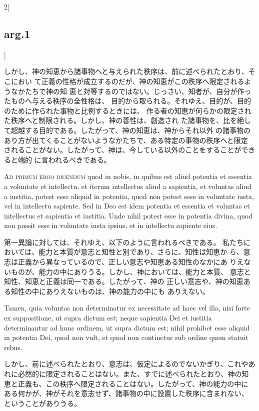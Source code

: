\documentclass[paper=a4paper,fontsize=10pt,jafontsize=9pt,titlepage]{jlreq}
\begin{document}
\begin{paracol}{2}[\subsection{arg.1}]
\switchcolumn

しかし、神の知恵から諸事物へと与えられた秩序は、前に述べられたとおり、そこにおい
て正義の性格が成立するのだが、神の知恵がこの秩序へ限定されるようなかたちで神の知
恵と対等するのではない。じっさい、知者が、自分が作ったものへ与える秩序の全性格は、
目的から取られる。それゆえ、目的が、目的のために作られた事物と比例するときには、
作る者の知恵が何らかの限定された秩序へと制限される。しかし、神の善性は、創造され
た諸事物を、比を絶して超越する目的である。したがって、神の知恵は、神からそれ以外
の諸事物のあり方が出てくることがないようなかたちで、ある特定の事物の秩序へと限定
されることがない。したがって、神は、今している以外のことをすることができると端的
に言われるべきである。

\switchcolumn*[\subsection{ad.1}]

{\scshape Ad primum ergo dicendum} quod in nobis, in quibus est aliud potentia
et essentia a voluntate et intellectu, et iterum intellectus aliud a sapientia,
et voluntas aliud a iustitia, potest esse aliquid in potentia, quod non potest
esse in voluntate iusta, vel in intellectu sapiente. Sed in Deo est idem
potentia et essentia et voluntas et intellectus et sapientia et iustitia. Unde
nihil potest esse in potentia divina, quod non possit esse in voluntate iusta
ipsius, et in intellectu sapiente eius.

\switchcolumn

第一異論に対しては、それゆえ、以下のように言われるべきである。
私たちにおいては、能力と本質が意志と知性と別であり、さらに、知性は知恵か
ら、意志は正義から異なっているので、正しい意志や知恵ある知性のなかにあ
りえないものが、能力の中にありうる。しかし、神においては、能力と本質、
意志と知性、知恵と正義は同一である。したがって、神の
正しい意志や、神の知恵ある知性の中にありえないものは、神の能力の中にも
ありえない。

\switchcolumn*

Tamen, quia voluntas non
determinatur ex necessitate ad haec vel illa, nisi forte ex
suppositione, ut supra dictum est; neque sapientia Dei et iustitia
determinantur ad hunc ordinem, ut supra dictum est; nihil prohibet esse
aliquid in potentia Dei, quod non vult, et quod non continetur sub
ordine quem statuit rebus.

\switchcolumn

しかし、前に述べられたとおり、意志は、仮定によるのでないかぎり、これやあ
れに必然的に限定されることはない。また、すでに述べられたとおり、神の知
恵と正義も、この秩序へ限定されることはない。したがって、神の能力の中に
ある何かが、神がそれを意志せず、諸事物の中に設置した秩序に含まれない、
ということがありうる。


\end{paracol}
\end{document}
